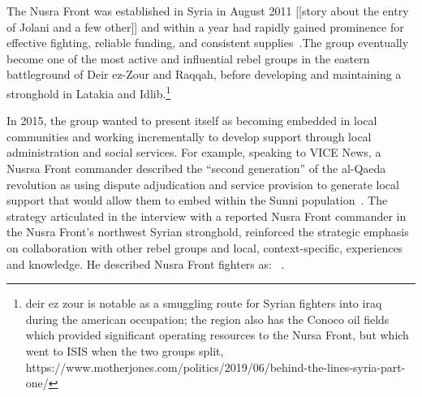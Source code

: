 The Nusra Front was established in Syria in August 2011 [[story about the entry of Jolani and a few other]] and within a year had rapidly gained prominence for effective fighting, reliable funding, and consistent supplies~\autocite{bbc2016jfs}.The group eventually become one of the most active and influential rebel groups in the eastern battleground of Deir ez-Zour and Raqqah, before developing and maintaining a stronghold in Latakia and Idlib.\footnote{deir ez zour is notable as a smuggling route for Syrian fighters into iraq during the american occupation; the region also has the Conoco oil fields which provided significant operating resources to the Nursa Front, but which went to ISIS when the two groups split, https://www.motherjones.com/politics/2019/06/behind-the-lines-syria-part-one/}


In 2015, the group wanted to present itself as becoming embedded in local communities and working incrementally to develop support through local administration and social services. For example, speaking to VICE News, a Nusrsa Front commander described the “second generation” of the al-Qaeda revolution as using dispute adjudication and service provision to generate local support that would allow them to embed within the Sunni population~\autocite{dareih2015unmasked}. The strategy articulated in the interview with a reported Nusra Front commander in the Nusra Front’s northwest Syrian stronghold, reinforced the strategic emphasis on collaboration with other rebel groups and local, context-specific, experiences and knowledge. He described Nusra Front fighters as: ~\autocite{dareih2015unmasked}.

